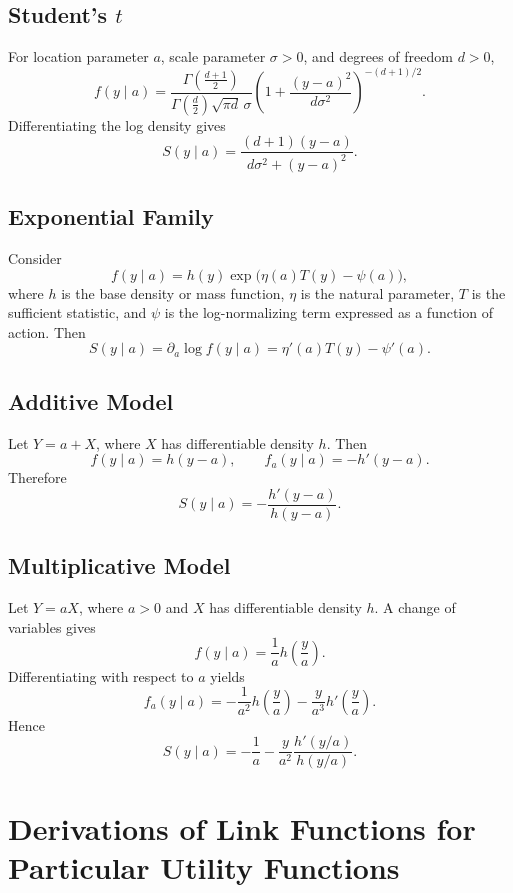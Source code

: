 \documentclass[12pt]{article}
\begin{document}
\subsection{Student's $t$}

For location parameter $a$, scale parameter $\sigma>0$, and degrees of
freedom $d>0$,
\[
    f(y\mid a)
    =\frac{\Gamma\left(\frac{d+1}{2}\right)}
           {\Gamma\left(\frac{d}{2}\right)\sqrt{\pi d}\,\sigma}
      \left(1+\frac{(y-a)^2}{d\sigma^2}\right)^{-(d+1)/2}.
\]
Differentiating the log density gives
\[
    S(y\mid a)
    =\frac{(d+1)(y-a)}{d\sigma^2+(y-a)^2}.
\]

\subsection{Exponential Family}

Consider
\[
    f(y\mid a)
    =h(y)\exp\bigl(\eta(a)T(y)-\psi(a)\bigr),
\]
where $h$ is the base density or mass function, $\eta$ is the natural
parameter, $T$ is the sufficient statistic, and $\psi$ is the log-normalizing
term expressed as a function of action.  Then
\[
    S(y\mid a)
    =\partial_a\log f(y\mid a)
    =\eta'(a)T(y)-\psi'(a).
\]

\subsection{Additive Model}

Let $Y=a+X$, where $X$ has differentiable density $h$.  Then
\[
    f(y\mid a)=h(y-a),
    \qquad
    f_a(y\mid a)=-h'(y-a).
\]
Therefore
\[
    S(y\mid a)=-\frac{h'(y-a)}{h(y-a)}.
\]

\subsection{Multiplicative Model}

Let $Y=aX$, where $a>0$ and $X$ has differentiable density $h$.  A change of
variables gives
\[
    f(y\mid a)=\frac{1}{a}h\left(\frac{y}{a}\right).
\]
Differentiating with respect to $a$ yields
\[
    f_a(y\mid a)
    =-\frac{1}{a^2}h\left(\frac{y}{a}\right)
     -\frac{y}{a^3}h'\left(\frac{y}{a}\right).
\]
Hence
\[
    S(y\mid a)
    =-\frac{1}{a}
     -\frac{y}{a^2}\frac{h'(y/a)}{h(y/a)}.
\]

\section{Derivations of Link Functions for Particular Utility Functions}
\end{document}
